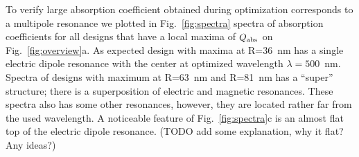 \documentclass[aps,prl,twocolumn,showpacs,superscriptaddress,groupedaddress]{revtex4-1}
\begin{document}
\begin{figure}
\end{figure}
To verify large absorption coefficient obtained during optimization
corresponds to a multipole resonance we plotted in
Fig.~\ref{fig:spectra} spectra of absorption coefficients for all
designs that have a local maxima of $Q_{\rm abs}$ on
Fig.~\ref{fig:overview}a.  As expected design with maxima at R=36~nm
has a single electric dipole resonance with the center at optimized
wavelength $\lambda=500$~nm.  Spectra of designs with maximum at
R=63~nm and R=81~nm has a ``super'' structure; there is a
superposition of electric and magnetic resonances.  These spectra also
has some other resonances, however, they are located rather far from
the used wavelength.  A noticeable feature of Fig.~\ref{fig:spectra}c is
an almost flat top of the electric dipole resonance. (TODO add some
explanation, why it flat? Any ideas?)
\end{document}
